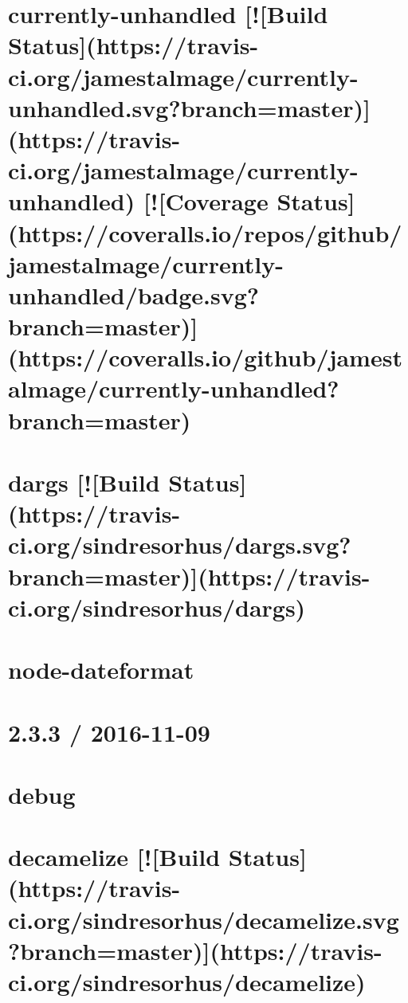 \documentclass[twoside]{book}
\newcommand{\+}{\discretionary{\mbox{\scriptsize$\hookleftarrow$}}{}{}}
\begin{document}
\chapter{currently-\/unhandled \mbox{[}!\mbox{[}Build Status\mbox{]}(https\+://travis-\/ci.org/jamestalmage/currently-\/unhandled.svg?branch=master)\mbox{]}(https\+://travis-\/ci.org/jamestalmage/currently-\/unhandled) \mbox{[}!\mbox{[}Coverage Status\mbox{]}(https\+://coveralls.io/repos/github/jamestalmage/currently-\/unhandled/badge.svg?branch=master)\mbox{]}(https\+://coveralls.io/github/jamestalmage/currently-\/unhandled?branch=master)}
\label{md_app_web_node_modules_currently-unhandled_readme}

\chapter{dargs \mbox{[}!\mbox{[}Build Status\mbox{]}(https\+://travis-\/ci.org/sindresorhus/dargs.svg?branch=master)\mbox{]}(https\+://travis-\/ci.org/sindresorhus/dargs)}
\label{md_app_web_node_modules_dargs_readme}

\chapter{node-\/dateformat}
\label{md_app_web_node_modules_dateformat__readme}

\chapter{2.3.3 / 2016-\/11-\/09}
\label{md_app_web_node_modules_debug__c_h_a_n_g_e_l_o_g}

\chapter{debug}
\label{md_app_web_node_modules_debug__readme}

\chapter{decamelize \mbox{[}!\mbox{[}Build Status\mbox{]}(https\+://travis-\/ci.org/sindresorhus/decamelize.svg?branch=master)\mbox{]}(https\+://travis-\/ci.org/sindresorhus/decamelize)}
\label{md_app_web_node_modules_decamelize_readme}

\end{document}
